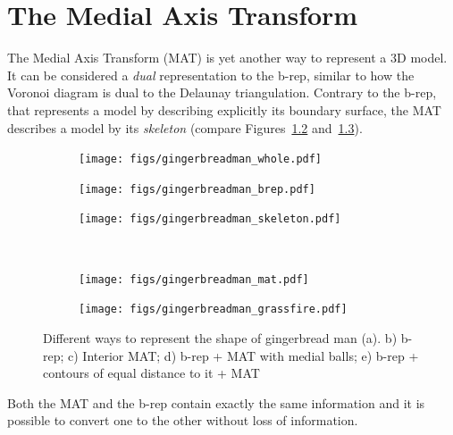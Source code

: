 
\setchapterpreamble[u]{\margintoc}

\graphicspath{{mat/}}

\chapter{The Medial Axis Transform}%
\label{chap:mat}

The Medial Axis Transform (MAT) is yet another way to represent a 3D model.
It can be considered a \emph{dual} representation to the b-rep, similar to how the Voronoi diagram is dual to the Delaunay triangulation. 
Contrary to the b-rep, that represents a model by describing explicitly its boundary surface, the MAT describes a model by its \emph{skeleton} (compare Figures~\ref{fig:gbm:brep} and~\ref{fig:gbm:maxis}).
\begin{figure}
	\centering
	\begin{subfigure}[b]{0.3\linewidth}
		\centering
		\texttt{[image: figs/gingerbreadman\_whole.pdf]}
		\caption{}
		\label{fig:gbm:whole}
	\end{subfigure}
	\begin{subfigure}[b]{0.3\linewidth}
		\centering
		\texttt{[image: figs/gingerbreadman\_brep.pdf]}
		\caption{}
		\label{fig:gbm:brep}
	\end{subfigure}
	\begin{subfigure}[b]{0.3\linewidth}
		\centering
		\texttt{[image: figs/gingerbreadman\_skeleton.pdf]}
		\caption{}
		\label{fig:gbm:maxis}
	\end{subfigure}\\
	\begin{subfigure}[b]{0.3\linewidth}
		\centering
		\texttt{[image: figs/gingerbreadman\_mat.pdf]}
		\caption{}
		\label{fig:gbm:mballs}
	\end{subfigure}
	\begin{subfigure}[b]{0.3\linewidth}
		\centering
		\texttt{[image: figs/gingerbreadman\_grassfire.pdf]}
		\caption{}
		\label{fig:gbm:dt}
	\end{subfigure}
	
	\caption{Different ways to represent the shape of gingerbread man (a). b) b-rep; c) Interior MAT; d) b-rep + MAT with medial balls; e) b-rep + contours of equal distance to it + MAT}
	\label{fig:gingerman}
\end{figure}
Both the MAT and the b-rep contain exactly the same information and it is possible to convert one to the other without loss of information.

